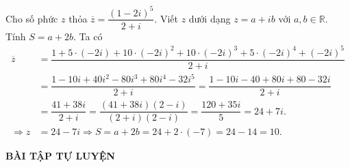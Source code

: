 \begin{vd}%
	Cho số phức $z$ thỏa $\overline{z} = \dfrac{(1-2i)^5}{2+i}$. Viết $z$ dưới dạng $z=a+ib$ với $a,b \in \mathbb{R}$. Tính $S=a+2b$.
	\loigiai 
	{
		Ta có
		\begin{align*}
		\overline{z} &= \dfrac{1+5 \cdot (-2i)+10 \cdot (-2i)^2+10 \cdot (-2i)^3+5 \cdot (-2i)^4+(-2i)^5}{2+i} \\
		&= \dfrac{1-10i+40i^2-80i^3+80i^4-32i^5}{2+i} = \dfrac{1-10i-40+80i+80-32i}{2+i} \\
		&= \dfrac{41+38i}{2+i} = \dfrac{(41+38i)(2-i)}{(2+i)(2-i)} = \dfrac{120+35i}{5} = 24+7i. \\
		\Rightarrow z&=24-7i \Rightarrow S=a+2b=24+2 \cdot (-7) = 24-14=10.
		\end{align*}
	}
\end{vd}
\begin{center}
	\textbf{BÀI TẬP TỰ LUYỆN}
\end{center}
